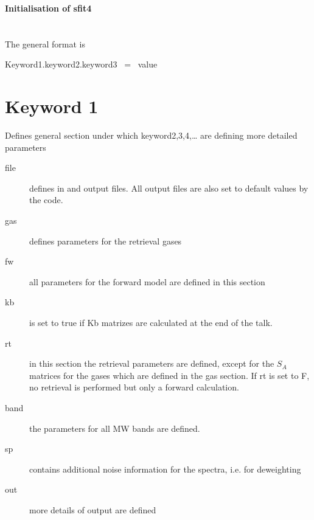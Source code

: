 \documentclass{article}
\title{}
\author{Mathias Palm}
\date{2019-11-14}
\begin{document}
\clearpage\setcounter{page}{1}\pagestyle{Standard}
{\centering\bfseries
Initialisation of sfit4
\par}

\section{}
{
The general format is }

{
Keyword1.keyword2.keyword3 \ = \ value}


\bigskip

\section{Keyword 1}

Defines general section under which keyword2,3,4,{\dots} are defining more detailed parameters

\begin{description}
\item[file] defines in and output files. All output files are also set to default values by the code.
\item[gas] defines parameters for the retrieval gases
\item[fw] all parameters for the forward model are defined in this section
\item[kb] is set to true if Kb matrizes are calculated at the end of the talk.
\item[rt] in this section the retrieval parameters are defined, except for the $S_A$ matrices for the gases which are
defined in the gas section. If rt is set to F, no retrieval is performed but only a forward calculation.
\item[band] the parameters for all MW bands are defined. 
\item[sp] contains additional noise information for the spectra, i.e. for deweighting
\item[out] more details of output are defined
\end{description}
\end{document}
